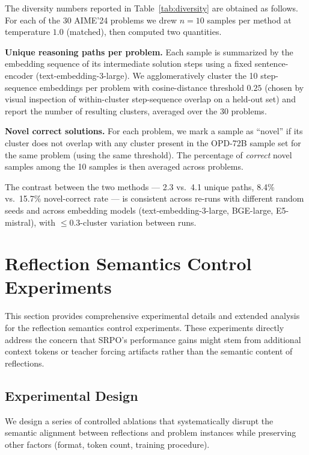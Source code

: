 \documentclass{article}
\newcommand{\method}{SRPO}
\theoremstyle{plain}
\theoremstyle{definition}
\theoremstyle{remark}
\begin{document}
The diversity numbers reported in Table~\ref{tab:diversity} are obtained as follows.
For each of the 30 AIME'24 problems we drew $n=10$ samples per method at temperature $1.0$ (matched), then computed two quantities.

\textbf{Unique reasoning paths per problem.}
Each sample is summarized by the embedding sequence of its intermediate solution steps using a fixed sentence-encoder (text-embedding-3-large).
We agglomeratively cluster the 10 step-sequence embeddings per problem with cosine-distance threshold $0.25$ (chosen by visual inspection of within-cluster step-sequence overlap on a held-out set) and report the number of resulting clusters, averaged over the 30 problems.

\textbf{Novel correct solutions.}
For each problem, we mark a sample as ``novel'' if its cluster does not overlap with any cluster present in the OPD-72B sample set for the same problem (using the same threshold).
The percentage of \emph{correct} novel samples among the 10 samples is then averaged across problems.

The contrast between the two methods --- 2.3 vs.\ 4.1 unique paths, 8.4\% vs.\ 15.7\% novel-correct rate --- is consistent across re-runs with different random seeds and across embedding models (text-embedding-3-large, BGE-large, E5-mistral), with $\leq 0.3$-cluster variation between runs.


\newpage
\section{Reflection Semantics Control Experiments}
\label{appendix:semantics}

This section provides comprehensive experimental details and extended analysis for the reflection semantics control experiments. These experiments directly address the concern that \method{}'s performance gains might stem from additional context tokens or teacher forcing artifacts rather than the semantic content of reflections.

\subsection{Experimental Design}

We design a series of controlled ablations that systematically disrupt the semantic alignment between reflections and problem instances while preserving other factors (format, token count, training procedure).
\end{document}
